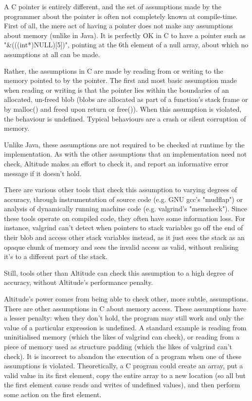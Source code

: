 \documentclass[10pt,a4paper]{report}
\begin{document}
A C pointer is entirely different, and the set of assumptions made by the programmer about the pointer is often not completely known at compile-time. First of all, the mere act of having a pointer does not make any assumptions about memory (unlike in Java). It is perfectly OK in C to have a pointer such as "&(((int*)NULL)[5])", pointing at the 6th element of a null array, about which no assumptions at all can be made.

Rather, the assumptions in C are made by reading from or writing to the memory pointed to by the pointer. The first and most basic assumption made when reading or writing is that the pointer lies within the boundaries of an allocated, un-freed blob (blobs are allocated as part of a function's stack frame or by malloc() and freed upon return or free()). When this assumption is violated, the behaviour is undefined. Typical behaviours are a crash or silent corruption of memory.

Unlike Java, these assumptions are not required to be checked at runtime by the implementation. As with the other assumptions that an implementation need not check, Altitude makes an effort to check it, and report an informative error message if it doesn't hold.

There are various other tools that check this assumption to varying degrees of accuracy, through instrumentation of source code (e.g. GNU gcc's "mudflap") or analysis of dynamically running machine code (e.g. valgrind's "memcheck"). Since these tools operate on compiled code, they often have some information loss. For instance, valgrind can't detect when pointers to stack variables go off the end of their blob and access other stack variables instead, as it just sees the stack as an opaque chunk of memory and sees the invalid access as valid, without realising it's to a different part of the stack.

Still, tools other than Altitude can check this assumption to a high degree of accuracy, without Altitude's performance penalty.

Altitude's power comes from being able to check other, more subtle, assumptions. There are other assumptions in C about memory access. These assumptions have a lesser penalty: when they don't hold, the program may still work and only the value of a particular expression is undefined. A standard example is reading from uninitialised memory (which the likes of valgrind can check), or reading from a piece of memory used as structure padding (which the likes of valgrind can't check). It is incorrect to abandon the execution of a program when one of these assumptions is violated. Theoretically, a C program could create an array, put a valid value in its first element, copy the entire array to a new location (so all but the first element cause reads and writes of undefined values), and then perform some action on the first element.
\end{document}
